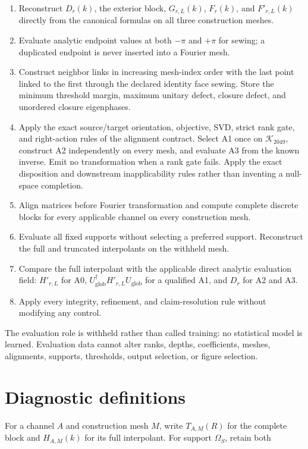 \documentclass[11pt]{article}
\begin{document}
\begin{enumerate}
\item Reconstruct $D_r(k)$, the exterior block, $G_{r,L}(k)$, $F_r(k)$, and
$F'_{r,L}(k)$ directly from the canonical formulas on all three construction meshes.
\item Evaluate analytic endpoint values at both $-\pi$ and $+\pi$ for sewing; a duplicated
endpoint is never inserted into a Fourier mesh.
\item Construct neighbor links in increasing mesh-index order with the last point linked to
the first through the declared identity face sewing. Store the minimum threshold
margin, maximum unitary defect, closure defect, and unordered closure eigenphases.
\item Apply the exact source/target orientation, objective, SVD, strict rank gate, and
right-action rules of the alignment contract. Select A1 once on $\mathcal K_{2049}$,
construct A2 independently on every mesh, and evaluate A3 from the known inverse. Emit no
transformation when a rank gate fails. Apply the exact disposition and downstream
inapplicability rules rather than inventing a null-space completion.
\item Align matrices before Fourier transformation and compute complete discrete blocks for
every applicable channel on every construction mesh.
\item Evaluate all fixed supports without selecting a preferred support. Reconstruct the
full and truncated interpolants on the withheld mesh.
\item Compare the full interpolant with the applicable direct analytic evaluation field:
$H'_{r,L}$ for A0, $U_{\mathrm{glob}}^\dagger H'_{r,L}U_{\mathrm{glob}}$ for a
qualified A1, and $D_r$ for A2 and A3.
\item Apply every integrity, refinement, and claim-resolution rule without modifying any
control.
\end{enumerate}

The evaluation role is withheld rather than called training: no statistical model is
learned. Evaluation data cannot alter ranks, depths, coefficients, meshes, alignments,
supports, thresholds, output selection, or figure selection.

\section{Diagnostic definitions}

For a channel $A$ and construction mesh $M$, write $T_{A,M}(R)$ for the complete block
and $H_{A,M}(k)$ for its full interpolant. For support $\Omega_S$, retain both
\end{document}
